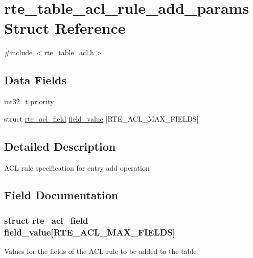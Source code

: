 \hypertarget{structrte__table__acl__rule__add__params}{}\section{rte\+\_\+table\+\_\+acl\+\_\+rule\+\_\+add\+\_\+params Struct Reference}
\label{structrte__table__acl__rule__add__params}


{\ttfamily \#include $<$rte\+\_\+table\+\_\+acl.\+h$>$}

\subsection*{Data Fields}
\begin{DoxyCompactItemize}
\item 
int32\+\_\+t \hyperlink{structrte__table__acl__rule__add__params_a41b7c4ba47c44a632d5903b1f1338ad0}{priority}
\item 
struct \hyperlink{structrte__acl__field}{rte\+\_\+acl\+\_\+field} \hyperlink{structrte__table__acl__rule__add__params_abe9119683c49ea1a0dca0e47ea78555d}{field\+\_\+value} \mbox{[}R\+T\+E\+\_\+\+A\+C\+L\+\_\+\+M\+A\+X\+\_\+\+F\+I\+E\+L\+D\+S\mbox{]}
\end{DoxyCompactItemize}


\subsection{Detailed Description}
A\+C\+L rule specification for entry add operation 

\subsection{Field Documentation}
\hypertarget{structrte__table__acl__rule__add__params_abe9119683c49ea1a0dca0e47ea78555d}{}
\subsubsection[{field\+\_\+value}]{\setlength{\rightskip}{0pt plus 5cm}struct {\bf rte\+\_\+acl\+\_\+field} field\+\_\+value\mbox{[}R\+T\+E\+\_\+\+A\+C\+L\+\_\+\+M\+A\+X\+\_\+\+F\+I\+E\+L\+D\+S\mbox{]}}\label{structrte__table__acl__rule__add__params_abe9119683c49ea1a0dca0e47ea78555d}
Values for the fields of the A\+C\+L rule to be added to the table \hypertarget{structrte__table__acl__rule__add__params_a41b7c4ba47c44a632d5903b1f1338ad0}{}
